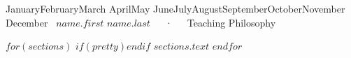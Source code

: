 \documentclass[12pt, letterpaper]{awesome-cv}
\renewcommand{\today}{\ifcase \month \or January\or February\or March\or %
April\or May \or June\or July\or August\or September\or October\or November\or %
December\fi\  \number \year}
\begin{document}
\makecvheader[R]

\makecvfooter
  {\today}
  {$name.first$ $name.last$~~~·~~~Teaching Philosophy}
  {\thepage}

\maketptitle

\begin{cvletter}
  $for(sections)$
    $if(pretty)$$endif$
    $sections.text$
  $endfor$
\end{cvletter}
\end{document}
